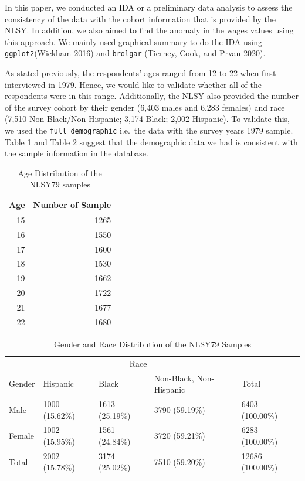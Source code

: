 \documentclass{article}
\begin{document}
In this paper, we conducted an IDA or a preliminary data analysis to assess the consistency of the data with the cohort information that is provided by the NLSY. In addition, we also aimed to find the anomaly in the wages values using this approach. We mainly used graphical summary to do the IDA using \texttt{ggplot2}(Wickham 2016) and \texttt{brolgar} (Tierney, Cook, and Prvan 2020).

As stated previously, the respondents' ages ranged from 12 to 22 when first interviewed in 1979. Hence, we would like to validate whether all of the respondents were in this range. Additionally, the \href{https://www.nlsinfo.org/content/cohorts/nlsy79/intro-to-the-sample/nlsy79-sample-introduction}{NLSY} also provided the number of the survey cohort by their gender (6,403 males and 6,283 females) and race (7,510 Non-Black/Non-Hispanic; 3,174 Black; 2,002 Hispanic). To validate this, we used the \texttt{full\_demographic} i.e.~the data with the survey years 1979 sample. Table \ref{tab:age-table} and Table \ref{tab:gender-race-table} suggest that the demographic data we had is consistent with the sample information in the database.

\begin{table}

\caption{\label{tab:age-table}Age Distribution of the NLSY79 samples}
\centering
\begin{tabular}[t]{r|r}
\hline
Age & Number of Sample\\
\hline
\rowcolor{gray!6}  15 & 1265\\
\hline
16 & 1550\\
\hline
\rowcolor{gray!6}  17 & 1600\\
\hline
18 & 1530\\
\hline
\rowcolor{gray!6}  19 & 1662\\
\hline
20 & 1722\\
\hline
\rowcolor{gray!6}  21 & 1677\\
\hline
22 & 1680\\
\hline
\end{tabular}
\end{table}

\begin{table}

\caption{\label{tab:gender-race-table}Gender and Race Distribution of the NLSY79 Samples}
\centering
\begin{tabular}[t]{l|l|l|l|l}
\hline
\multicolumn{1}{c|}{ } & \multicolumn{3}{c|}{Race} & \multicolumn{1}{c}{ } \\
\cline{2-4}
Gender & Hispanic & Black & Non-Black, Non-Hispanic & Total\\
\hline
\rowcolor{gray!6}  Male & 1000 (15.62\%) & 1613 (25.19\%) & 3790 (59.19\%) & 6403 (100.00\%)\\
\hline
Female & 1002 (15.95\%) & 1561 (24.84\%) & 3720 (59.21\%) & 6283 (100.00\%)\\
\hline
\rowcolor{gray!6}  Total & 2002 (15.78\%) & 3174 (25.02\%) & 7510 (59.20\%) & 12686 (100.00\%)\\
\hline
\end{tabular}
\end{table}
\end{document}
